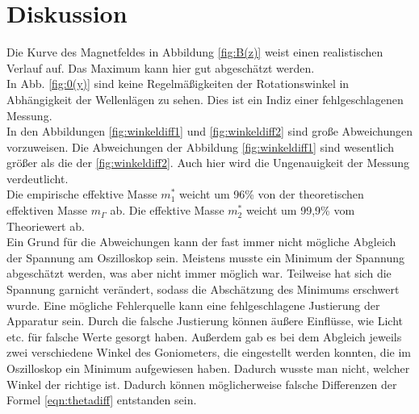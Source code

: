 \section{Diskussion}

Die Kurve des Magnetfeldes in Abbildung \ref{fig:B(z)} weist einen realistischen Verlauf auf.
Das Maximum kann hier gut abgeschätzt werden. \\

In Abb. \ref{fig:0(y)} sind keine Regelmäßigkeiten der Rotationswinkel in Abhängigkeit der Wellenlägen zu sehen.
Dies ist ein Indiz einer fehlgeschlagenen Messung. \\

In den Abbildungen \ref{fig:winkeldiff1} und \ref{fig:winkeldiff2} sind große Abweichungen vorzuweisen.
Die Abweichungen der Abbildung \ref{fig:winkeldiff1} sind wesentlich größer als die der \ref{fig:winkeldiff2}.
Auch hier wird die Ungenauigkeit der Messung verdeutlicht. \\

Die empirische effektive Masse $m_1^*$ weicht um 96\% von der theoretischen effektiven Masse $m_{\Gamma}$ ab.
Die effektive Masse $m_2^*$ weicht um 99,9\% vom Theoriewert ab. \\

Ein Grund für die Abweichungen kann der fast immer nicht mögliche Abgleich der Spannung am Oszilloskop sein.
Meistens musste ein Minimum der Spannung abgeschätzt werden, was aber nicht immer möglich war.
Teilweise hat sich die Spannung garnicht verändert, sodass die Abschätzung des Minimums erschwert wurde.
Eine mögliche Fehlerquelle kann eine fehlgeschlagene Justierung der Apparatur sein.
Durch die falsche Justierung können äußere Einflüsse, wie Licht etc. für falsche Werte gesorgt haben.
Außerdem gab es bei dem Abgleich jeweils zwei verschiedene Winkel des Goniometers, die eingestellt werden konnten,
die im Oszilloskop ein Minimum aufgewiesen haben. Dadurch wusste man nicht, welcher Winkel der richtige ist.
Dadurch können möglicherweise falsche Differenzen der Formel \eqref{eqn:thetadiff} entstanden sein.
